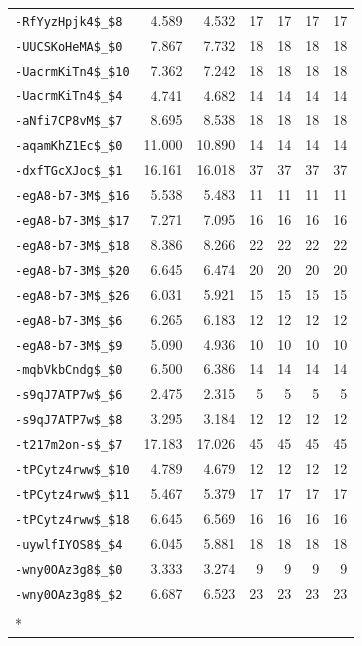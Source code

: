 \begin{longtable}{lrrrrrr}
\nolinkurl{-RfYyzHpjk4$_$8} & 4.589 & 4.532 & 17 & 17 & 17 & 17\\
\nolinkurl{-UUCSKoHeMA$_$0} & 7.867 & 7.732 & 18 & 18 & 18 & 18\\
\nolinkurl{-UacrmKiTn4$_$10} & 7.362 & 7.242 & 18 & 18 & 18 & 18\\
\nolinkurl{-UacrmKiTn4$_$4} & 4.741 & 4.682 & 14 & 14 & 14 & 14\\
\nolinkurl{-aNfi7CP8vM$_$7} & 8.695 & 8.538 & 18 & 18 & 18 & 18\\
\nolinkurl{-aqamKhZ1Ec$_$0} & 11.000 & 10.890 & 14 & 14 & 14 & 14\\
\nolinkurl{-dxfTGcXJoc$_$1} & 16.161 & 16.018 & 37 & 37 & 37 & 37\\
\nolinkurl{-egA8-b7-3M$_$16} & 5.538 & 5.483 & 11 & 11 & 11 & 11\\
\nolinkurl{-egA8-b7-3M$_$17} & 7.271 & 7.095 & 16 & 16 & 16 & 16\\
\nolinkurl{-egA8-b7-3M$_$18} & 8.386 & 8.266 & 22 & 22 & 22 & 22\\
\nolinkurl{-egA8-b7-3M$_$20} & 6.645 & 6.474 & 20 & 20 & 20 & 20\\
\nolinkurl{-egA8-b7-3M$_$26} & 6.031 & 5.921 & 15 & 15 & 15 & 15\\
\nolinkurl{-egA8-b7-3M$_$6} & 6.265 & 6.183 & 12 & 12 & 12 & 12\\
\nolinkurl{-egA8-b7-3M$_$9} & 5.090 & 4.936 & 10 & 10 & 10 & 10\\
\nolinkurl{-mqbVkbCndg$_$0} & 6.500 & 6.386 & 14 & 14 & 14 & 14\\
\nolinkurl{-s9qJ7ATP7w$_$6} & 2.475 & 2.315 & 5 & 5 & 5 & 5\\
\nolinkurl{-s9qJ7ATP7w$_$8} & 3.295 & 3.184 & 12 & 12 & 12 & 12\\
\nolinkurl{-t217m2on-s$_$7} & 17.183 & 17.026 & 45 & 45 & 45 & 45\\
\nolinkurl{-tPCytz4rww$_$10} & 4.789 & 4.679 & 12 & 12 & 12 & 12\\
\nolinkurl{-tPCytz4rww$_$11} & 5.467 & 5.379 & 17 & 17 & 17 & 17\\
\nolinkurl{-tPCytz4rww$_$18} & 6.645 & 6.569 & 16 & 16 & 16 & 16\\
\nolinkurl{-uywlfIYOS8$_$4} & 6.045 & 5.881 & 18 & 18 & 18 & 18\\
\nolinkurl{-wny0OAz3g8$_$0} & 3.333 & 3.274 & 9 & 9 & 9 & 9\\
\nolinkurl{-wny0OAz3g8$_$2} & 6.687 & 6.523 & 23 & 23 & 23 & 23\\
\addlinespace[0.5em]
\multicolumn{7}{l}{\textbf{2. 部分词通过筛选且三种模态都可观测（46条）}}\\*

\end{longtable}
